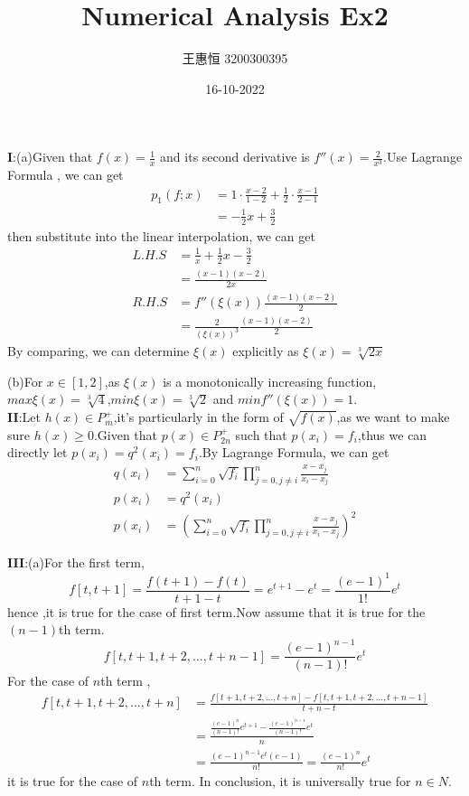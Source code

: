 \documentclass{ctexart}
\title{Numerical Analysis Ex2}
\date{16-10-2022}
\author{王惠恒 3200300395}
\begin{document}
\maketitle
\textbf{I}:(a)Given that $f(x)=\frac{1}{x}$ and its second derivative is $f''(x)=\frac{2}{x^3}$.Use Lagrange Formula , we can get
\begin{align*}
    p_1(f;x)&=1 \cdot \frac{x-2}{1-2} +\frac{1}{2} \cdot \frac{x-1}{2-1}\\
    &=-\frac{1}{2}x+\frac{3}{2}
\end{align*}
then substitute into the linear interpolation, we can get
\begin{align*}
    L.H.S&=\frac{1}{x}+\frac{1}{2}x-\frac{3}{2}\\
    &=\frac{(x-1)(x-2)}{2x}\\
    R.H.S&=f''(\xi (x))\frac{(x-1)(x-2)}{2}\\
    &=\frac{2}{(\xi (x))^3}\frac{(x-1)(x-2)}{2}
\end{align*}
By comparing, we can determine $\xi (x)$ explicitly as $\xi(x)=\sqrt[3]{2x} $

(b)For $x \in [1,2]$,as $\xi (x)$ is a monotonically increasing function, $max{\xi (x)}=\sqrt[3]{4}$,$min {\xi (x)}=\sqrt[3]{2}$ 
and $minf''(\xi (x))=1$.\\

\textbf{II}:Let $h(x) \in P_m^+$,it's particularly in the form of $\sqrt{f(x)}$,as we want to make sure $h(x) \geq 0$.Given that $p(x) \in P_{2n}^+$ such that $p(x_i)=f_i$,thus we can directly let $p(x_i)=q^2(x_i)=f_i$.By Lagrange Formula, we can get
\begin{align*}
    q(x_i)&=\sum_{i=0}^{n} \sqrt{f_i} \prod_{j=0,j \neq i}^{n} \frac{x-x_j}{x_i-x_j}\\
    p(x_i)&=q^2(x_i)\\
    p(x_i)&=(\sum_{i=0}^{n} \sqrt{f_i} \prod_{j=0,j \neq i}^{n} \frac{x-x_j}{x_i-x_j})^2
\end{align*}

\textbf{III}:(a)For the first term,
$$f[t,t+1]=\frac{f(t+1)-f(t)}{t+1-t}=e^{t+1}-e^t=\frac{(e-1)^1}{1!}e^t$$
hence ,it is true for the case of first term.Now assume that it is true for the $(n-1)$th term.
$$f[t,t+1,t+2,...,t+n-1]=\frac{(e-1)^{n-1}}{(n-1)!}e^t$$
For the case of $n$th term , 
\begin{align*}
    f[t,t+1,t+2,...,t+n]&=\frac{f[t+1,t+2,...,t+n]-f[t,t+1,t+2,...,t+n-1]}{t+n-t}\\
   &=\frac{\frac{(e-1)^n}{(n-1)!}e^{t+1}-\frac{(e-1)^{n-1}}{(n-1)!}e^t}{n}\\
   &=\frac{(e-1)^{n-1}e^t(e-1)}{n!}=\frac{(e-1)^n}{n!}e^t
\end{align*}
it is true for the case of $n$th term. In conclusion, it is universally true for $n \in N$.
\end{document}
